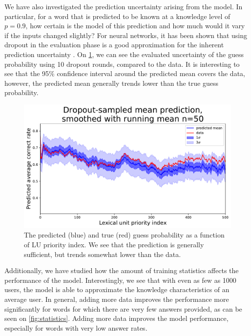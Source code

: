 We have also investigated the prediction uncertainty arising from the model. In particular, for a word that is predicted to be known at a knowledge level of $p=0.9$, how certain is the model of this prediction and how much would it vary if the inputs changed slightly? For neural networks, it has been shown that using dropout in the evaluation phase is a good approximation for the inherent prediction uncertainty \cite{gal2016dropout}. On \cref{fig:uncertainty}, we can see the evaluated uncertainty of the guess probability using 10 dropout rounds, compared to the data. It is interesting to see that the 95\% confidence interval around the predicted mean covers the data, however, the predicted mean generally trends lower than the true guess probability.

\begin{figure}[ht]
\centering
\includegraphics[width=1.0\linewidth]{figures/lingvist/uncertainty.pdf}
\caption{The predicted (blue) and true (red) guess probability as a function of LU priority index. We see that the prediction is generally sufficient, but trends somewhat lower than the data.}
\label{fig:uncertainty}
\end{figure}

Additionally, we have studied how the amount of training statistics affects the performance of the model. Interestingly, we see that with even as few as 1000 users, the model is able to approximate the knowledge characteristics of an average user. In general, adding more data improves the performance more significantly for words for which there are very few answers provided, as can be seen on \cref{fig:statistics}. Adding more data improves the model performance, especially for words with very low answer rates.

